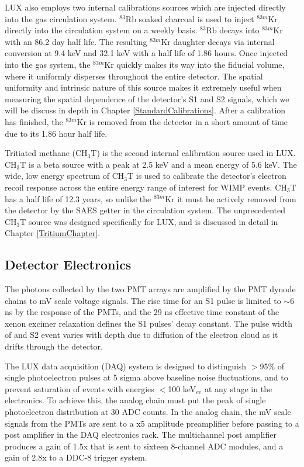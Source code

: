 \documentclass[a4paper,12pt]{article}
\begin{document}
LUX also employs two internal calibrations sources which are injected directly into the gas circulation system.   $^{83}$Rb soaked charcoal is used to inject $^{83m}$Kr directly into the circulation system on a weekly basis.  $^{83}$Rb decays into $^{83m}$Kr with an 86.2 day half life.   The resulting $^{83m}$Kr daughter decays via internal conversion at 9.4 keV and 32.1 keV with a half life of 1.86 hours.  Once injected into the gas system, the $^{83m}$Kr quickly makes its way into the fiducial volume, where it uniformly disperses throughout the entire detector.  The spatial uniformity and intrinsic nature of this source makes it extremely useful when measuring the spatial dependence of the detector's S1 and S2 signals, which we will be discuss in depth in Chapter \ref{StandardCalibrations}.  After a calibration has finished, the $^{83m}$Kr is removed from the detector in a short amount of time due to its 1.86 hour half life.  

Tritiated methane (CH$_3$T) is the second internal calibration source used in LUX.  CH$_3$T is a beta source with a peak at 2.5 keV and a mean energy of 5.6 keV.  The wide, low energy spectrum of CH$_3$T is used to calibrate the detector's electron recoil response across the entire energy range of interest for WIMP events.  CH$_3$T has a half life of 12.3 years, so unlike the  $^{83m}$Kr it must be actively removed from the detector by the SAES getter in the circulation system.  The unprecedented CH$_3$T source was designed specifically for LUX, and is discussed in detail in Chapter \ref{TritiumChapter}.


\subsection{Detector Electronics}

The photons collected by the two PMT arrays are amplified by the PMT dynode chains to mV scale voltage signals.  The rise time for an S1 pulse is limited to $\sim$6 ns by the response of the PMTs, and the 29 ns effective time constant of the xenon excimer relaxation defines the S1 pulses' decay constant.  The pulse width of and S2 event varies with depth due to diffusion of the electron cloud as it drifts through the detector. 

The LUX data acquisition (DAQ) system  is designed to distinguish $>$95\% of single photoelectron pulses at 5 sigma above baseline noise fluctuations, and to prevent saturation of events with energies $<$100 keV$_{ee}$ at any stage in the electronics.  To achieve this, the analog chain must put the peak of single photoelectron distribution at 30 ADC counts.  In the analog chain, the mV scale signals from the PMTs are sent to a x5 amplitude preamplifier before passing to a post amplifier in the DAQ electronics rack. The multichannel post amplifier produces a gain of 1.5x that is sent to sixteen 8-channel ADC modules, and a gain of 2.8x to a DDC-8 trigger system.
\end{document}

